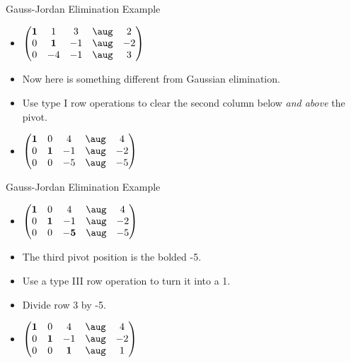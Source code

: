 \documentclass{beamer}
\begin{document}

\begin{frame}{Gauss-Jordan Elimination Example}

\begin{itemize}
\item $
\begin{pmatrix}
\bf{1} &            1    &    3    &  \aug &    2 \\
        0  &   \bf{ 1 }  &   -1    &  \aug &   -2  \\
        0  &            -4   &   -1    &  \aug &    3  \\
\end{pmatrix}
$
\item Now here is something different from Gaussian elimination.
\item Use type I row operations to clear the second column below \emph{and above} the pivot.
\item $
\begin{pmatrix}
\bf{1} &            0    &    4    &  \aug &    4 \\
        0  &   \bf{ 1 }  &   -1    &  \aug &   -2  \\
        0  &            0    &   -5    &  \aug &   -5  \\
\end{pmatrix}
$
\end{itemize}
\end{frame}


\begin{frame}{Gauss-Jordan Elimination Example}

\begin{itemize}
\item $
\begin{pmatrix}
\bf{1} &            0    &             4    &  \aug &    4 \\
        0  &   \bf{ 1 }  &            -1    &  \aug &   -2  \\
        0  &            0    &   \bf{-5}    &  \aug &   -5  \\
\end{pmatrix}
$
\item The third pivot position is the bolded -5.
\item Use a type III row operation to turn it into a 1.
\item Divide row 3 by -5.
\item $
\begin{pmatrix}
\bf{1} &            0    &             4    &  \aug &    4 \\
        0  &   \bf{ 1 }  &            -1    &  \aug &   -2  \\
        0  &            0    &   \bf{1}     &  \aug &    1  \\
\end{pmatrix}
$
\end{itemize}
\end{frame}
\end{document}
